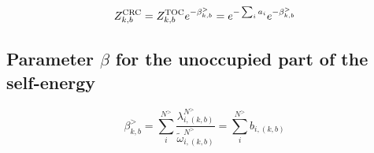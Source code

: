 \documentclass[a4paper,12pt]{article}
\begin{document}
\begin{equation}
  Z_{k,b}^\textnormal{CRC} = Z_{k,b}^\textnormal{TOC} e^{ - \beta_{k,b}^> } =  e^{ - \sum_i a_i }  e^{ - \beta_{k,b}^> } 
\end{equation}


\subsection{Parameter $\beta$ for the unoccupied part of the self-energy}

\begin{equation}
 \beta_{k,b}^>  = \sum_i^{N^>} \frac{\lambda_{i,(k,b)}^{N^>}}{\tilde\omega_{i,(k,b)}^{N^>}} = \sum_i^{N^>} b_{i,(k,b)}
\end{equation}
\end{document}
